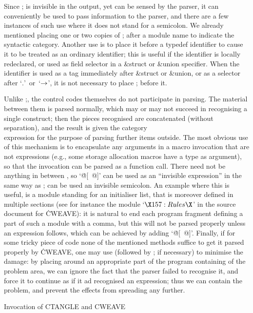 Since \:; is invisible in the output, yet can be sensed by the parser, it
can conveniently be used to pass information to the parser, and there are a
few instances of such use where it does not stand for a semicolon. We
already mentioned placing one or two copies of \:; after a module name to
indicate the syntactic category. Another use is to place it before a typedef
identifier to cause it to be treated as an ordinary identifier; this is
useful if the identifier is locally redeclared, or used as field selector in
a \&{struct} or \&{union} specifier. When the identifier is used as a tag
immediately after \&{struct} or \&{union}, or as a selector after
`$.$'~or~`${\rightarrow}$', it is not necessary to place \:; before it.

Unlike \:;, the control codes \:[~and~\:] themselves do not participate in
parsing. The material between them is parsed normally, which may or may not
succeed in recognising a single construct; then the pieces recognised are
concatenated (without separation), and the result is given the category
\\{expression} for the purpose of parsing further items outside. The most
obvious use of this mechanism is to encapsulate any arguments in a macro
invocation that are not expressions (e.g., some storage allocation macros
have a type as argument), so that the invocation can be parsed as a function
call. There need not be anything in between \:[~and~\:], so `\hbox{\.{@[
@]}}' can be used as an ``invisible expression'' in the same way as \:; can
be used an invisible semicolon. An example where this is useful, is a module
standing for an initialiser list, that is moreover defined in multiple
sections (see for instance the module `$\X157:Rules\X$' in the source
document for \.{CWEAVE}): it is natural to end each program fragment
defining a part of such a module with a comma, but this will not be parsed
properly unless an expression follows, which can be achieved by adding
`\hbox{\.{@[ @]}}'. Finally, if for some tricky piece of code none of the
mentioned methods suffice to get it parsed properly by \.{CWEAVE}, one may
use \:[~and~\:]  (followed by \:; if necessary) to minimise the damage: by
placing \:[~and~\:] around an appropriate part of the program containing of
the problem area, we can ignore the fact that the parser failed to recognise
it, and force it to continue as if it ad recognised an expression; thus we
can contain the problem, and prevent the effects from spreading any further.


\beginsection Invocation of {\tentex CTANGLE} and {\tentex CWEAVE}

